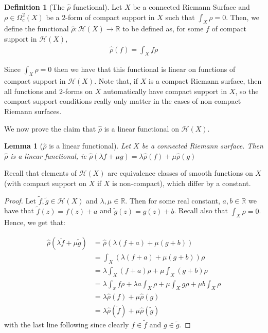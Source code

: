 \documentclass[11pt]{report}
\newtheorem{lemma}[thm]{Lemma}
\theoremstyle{definition}
\newtheorem{defn}[thm]{Definition}
\begin{document}
\begin{defn}[The $\hat{\rho}$ functional]
  Let $X$ be a connected Riemann Surface and $\rho \in \Omega^2_c(X)$ be a $2$-form of compact support in $X$ such that $\int_X \rho = 0$. Then, we define the functional $\hat{\rho} \colon \mathcal{H}(X) \rightarrow \mathbb{R}$ to be defined as, for some $f$ of compact support in $\mathcal{H}(X)$,
  \begin{align*}
    \hat{\rho}(f) = \int_X f\rho
  \end{align*}
\end{defn}

Since $\int_X \rho = 0$ then we have that this functional is linear on functions of compact support in $\mathcal{H}(X)$. Note that, if $X$ is a compact Riemann surface, then all functions and $2$-forms on $X$ automatically have compact support in $X$, so the compact support conditions really only matter in the cases of non-compact Riemann surfaces.

We now prove the claim that $\hat{\rho}$ is a linear functional on $\mathcal{H}(X)$.
\begin{lemma}[$\hat{\rho}$ is a linear functional]\label{rhohatlinear}
  Let $X$ be a connected Riemann surface. Then $\hat{\rho}$ is a linear functional, ie $\hat{\rho}(\lambda f+ \mu g) = \lambda \hat{\rho}(f) + \mu \hat{\rho}(g)$
\end{lemma}
Recall that elements of $\mathcal{H}(X)$ are equivalence classes of smooth functions on $X$ (with compact support on $X$ if $X$ is non-compact), which differ by a constant.
\begin{proof}
  Let $\tilde{f},\tilde{g} \in \mathcal{H}(X)$ and $\lambda,\mu \in \mathbb{R}$. Then for some real constant, $a,b \in \mathbb{R}$ we have that $\tilde{f}(z) = f(z) + a$ and $\tilde{g}(z) = g(z) + b$. Recall also that $\int_X \rho = 0$.
  Hence, we get that:

  \begin{align*}
    \hat{\rho}(\lambda \tilde{f}+ \mu \tilde{g}) &= \hat{\rho}(\lambda(f + a) + \mu(g + b)) \\
    &=\int_X (\lambda(f + a) + \mu(g + b))\rho \\
    &=\lambda \int_X (f + a)\rho + \mu \int_X (g + b)\rho \\
    &=\lambda \int_x f\rho + \lambda a\int_X \rho + \mu \int_X g\rho + \mu b\int_X \rho \\
    &=\lambda \hat{\rho}(f) + \mu \hat{\rho}(g)\\
    &=\lambda \hat{\rho}(\tilde{f}) + \mu \hat{\rho}(\tilde{g})
  \end{align*}
  with the last line following since clearly $f \in \tilde{f}$ and $g \in \tilde{g}$.
\end{proof}
\end{document}
